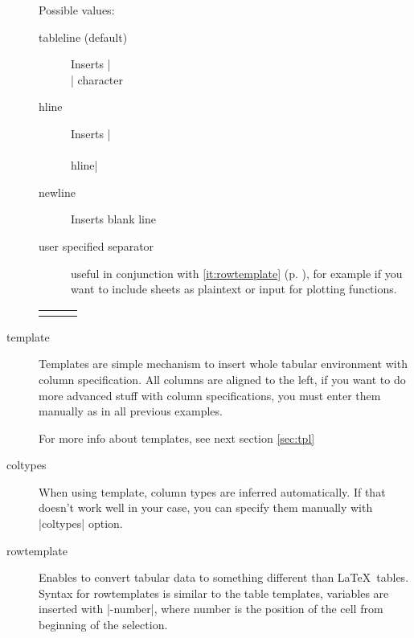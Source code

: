 \documentclass{ltxdoc}
\begin{document}
\begin{description}
Possible values:
\begin{description}
\item[tableline (default)] Inserts |\\| character
\item[hline] Inserts |\\ \\hline| 
\item[newline] Inserts blank line
\item[user specified separator] useful in conjunction with \ref{it:rowtemplate} 
(p. \pageref{it:rowtemplate}), for example if you want to include sheets 
as plaintext or input for plotting functions.  
\end{description} 
\begin{LTXexample}
\begin{tabular}{lll}
\end{tabular}     
\end{LTXexample} 

\item[template] Templates are simple mechanism to insert whole tabular environment with column specification. All columns are aligned to the left, if you want to do more advanced stuff with column specifications, you must enter them manually as in all previous examples.
\begin{LTXexample}
\end{LTXexample}
For more info about templates, see next section \ref{sec:tpl}

\item[coltypes] When using template, column types are inferred automatically. If that doesn't work well in your case, you can specify them manually with |coltypes| option.

  \begin{LTXexample}
  \end{LTXexample}

\item[rowtemplate] 
\makeatletter
\edef\@currentlabel{rowtemplate}
\label{it:rowtemplate} Enables to convert tabular data to something different than \LaTeX\ tables. 
Syntax for rowtemplates is similar to the table templates, variables are inserted with |-{number}|, where 
number is the position of the cell from beginning of the selection. 
\makeatother
\begin{LTXexample}
\end{LTXexample}


\end{description}
\end{document}
